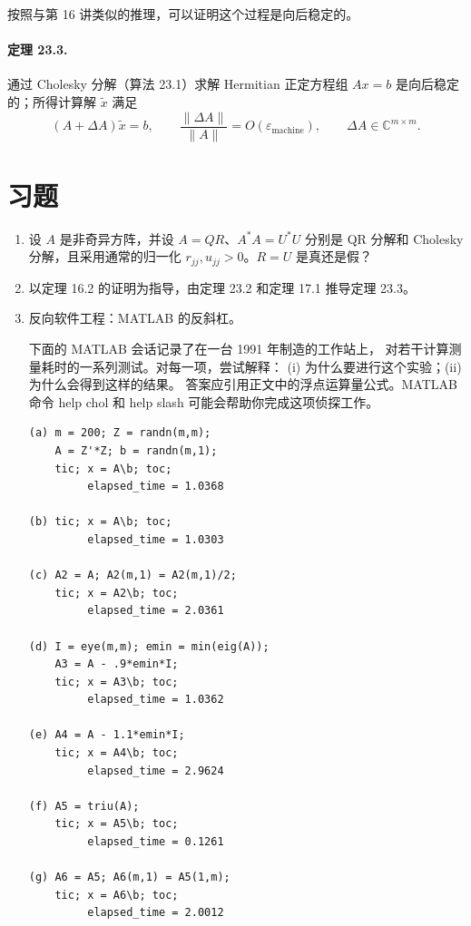 \documentclass[UTF8,fontset=none,12pt]{ctexart}
\newcommand{\epsmach}{\varepsilon_{\mathrm{machine}}}
\begin{document}
按照与第 16 讲类似的推理，可以证明这个过程是向后稳定的。

\paragraph{定理 23.3.}
通过 Cholesky 分解（算法 23.1）求解 Hermitian 正定方程组
$Ax=b$ 是向后稳定的；所得计算解 $\widetilde x$ 满足
\begin{equation}
(A+\Delta A)\widetilde x=b,\qquad
\frac{\|\Delta A\|}{\|A\|}=O(\epsmach),
\qquad \Delta A\in\mathbb{C}^{m\times m}.
\tag{23.6}
\end{equation}

\section*{习题}

\begin{enumerate}[label=\textbf{23.\arabic*.},leftmargin=*]
    \item 设 $A$ 是非奇异方阵，并设 $A=QR$、$A^*A=U^*U$
    分别是 QR 分解和 Cholesky 分解，且采用通常的归一化
    $r_{jj},u_{jj}>0$。$R=U$ 是真还是假？

    \item 以定理 16.2 的证明为指导，由定理 23.2 和定理 17.1
    推导定理 23.3。

    \item 反向软件工程：MATLAB 的反斜杠。

    下面的 MATLAB 会话记录了在一台 1991 年制造的工作站上，
    对若干计算测量耗时的一系列测试。对每一项，尝试解释：
    (i) 为什么要进行这个实验；(ii) 为什么会得到这样的结果。
    答案应引用正文中的浮点运算量公式。MATLAB 命令
    help chol 和 help slash 可能会帮助你完成这项侦探工作。

\begin{verbatim}
(a) m = 200; Z = randn(m,m);
    A = Z'*Z; b = randn(m,1);
    tic; x = A\b; toc;
         elapsed_time = 1.0368

(b) tic; x = A\b; toc;
         elapsed_time = 1.0303

(c) A2 = A; A2(m,1) = A2(m,1)/2;
    tic; x = A2\b; toc;
         elapsed_time = 2.0361

(d) I = eye(m,m); emin = min(eig(A));
    A3 = A - .9*emin*I;
    tic; x = A3\b; toc;
         elapsed_time = 1.0362

(e) A4 = A - 1.1*emin*I;
    tic; x = A4\b; toc;
         elapsed_time = 2.9624

(f) A5 = triu(A);
    tic; x = A5\b; toc;
         elapsed_time = 0.1261

(g) A6 = A5; A6(m,1) = A5(1,m);
    tic; x = A6\b; toc;
         elapsed_time = 2.0012
\end{verbatim}
\end{enumerate}
\end{document}
